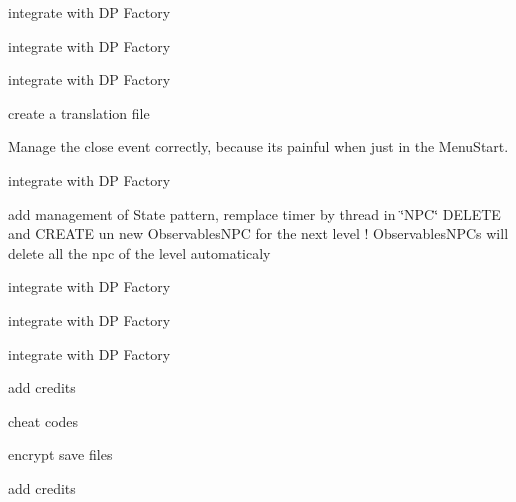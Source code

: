 
\begin{DoxyRefList}
\item[\label{todo__todo000001}%
\hypertarget{todo__todo000001}{}%
Class \hyperlink{class_b___movable}{B\+\_\+\+Movable} ]integrate with D\+P Factory  
\item[\label{todo__todo000002}%
\hypertarget{todo__todo000002}{}%
Class \hyperlink{class_b___wall}{B\+\_\+\+Wall} ]integrate with D\+P Factory  
\item[\label{todo__todo000003}%
\hypertarget{todo__todo000003}{}%
Class \hyperlink{class_b___water}{B\+\_\+\+Water} ]integrate with D\+P Factory  
\item[\label{todo__todo000005}%
\hypertarget{todo__todo000005}{}%
Class \hyperlink{class_g___gameboard}{G\+\_\+\+Gameboard} ]create a translation file  
\item[\label{todo__todo000007}%
\hypertarget{todo__todo000007}{}%
Class \hyperlink{class_g___main_game}{G\+\_\+\+Main\+Game} ]Manage the close event correctly, because it\textquotesingle{}s painful when just in the Menu\+Start.  
\item[\label{todo__todo000008}%
\hypertarget{todo__todo000008}{}%
Class \hyperlink{class_g___n_p_c}{G\+\_\+\+N\+P\+C} ]integrate with D\+P Factory  
\item[\label{todo__todo000009}%
\hypertarget{todo__todo000009}{}%
Class \hyperlink{class_observer___n_p_c}{Observer\+\_\+\+N\+P\+C} ]add management of State pattern, remplace timer by thread in \char`\"{}\+N\+P\+C\char`\"{}  D\+E\+L\+E\+T\+E and C\+R\+E\+A\+T\+E un new Observables\+N\+P\+C for the next level ! Observables\+N\+P\+Cs will delete all the npc of the level automaticaly  
\item[\label{todo__todo000010}%
\hypertarget{todo__todo000010}{}%
Class \hyperlink{class_p___fox}{P\+\_\+\+Fox} ]integrate with D\+P Factory  
\item[\label{todo__todo000011}%
\hypertarget{todo__todo000011}{}%
Class \hyperlink{class_p___wolf}{P\+\_\+\+Wolf} ]integrate with D\+P Factory  
\item[\label{todo__todo000004}%
\hypertarget{todo__todo000004}{}%
Class \hyperlink{struct_sliding_block}{Sliding\+Block} ]integrate with D\+P Factory  
\item[\label{todo__todo000012}%
\hypertarget{todo__todo000012}{}%
Class \hyperlink{class_w___menu_pause}{W\+\_\+\+Menu\+Pause} ]add credits 

cheat codes  
\item[\label{todo__todo000013}%
\hypertarget{todo__todo000013}{}%
Class \hyperlink{class_w___menu_start}{W\+\_\+\+Menu\+Start} ]encrypt save files 

add credits 
\end{DoxyRefList}